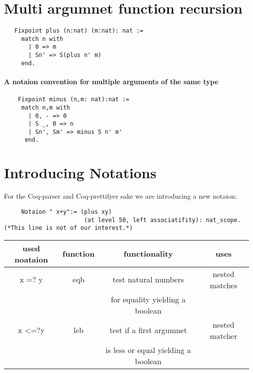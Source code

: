    \section{Multi argumnet function recursion}
   
   \begin{lstlisting}
   Fixpoint plus (n:nat) (m:nat): nat :=
     match n with
       | 0 => m
       | Sn' => S(plus n' m)
     end.
   \end{lstlisting}
   
   \paragraph{A notaion convention for multiple arguments of the same type}
   \begin{lstlisting}
    Fixpoint minus (n,m: nat):nat :=
     match n,m with
       | 0, - => 0
       | S _, 0 => n
       | Sn', Sm' => minus S n' m'
      end.
   \end{lstlisting}
        
   \section{Introducing Notations}
    For the Coq-parser and Coq-prettifyer sake we are introducing a new notaion:
    \begin{lstlisting}
     Notaion " x+y":= (plus xy)
                       (at level 50, left associatifity): nat_scope. (*This line is not of our interest.*)
    \end{lstlisting} 
   
   
   \begin{center}
   \begin{tabular}{|c|c|c|c|}
     \hline 
 	  used noataion & function        & functionality                       & uses           \\  \hline
  	  x =? y        & eqb             & test natural numbers                & nested matches \\  
  	                &                 & for equality yielding a boolean     &                \\  \hline
   	  x <=?y        & leb             & test if a first argumnet            & nested matcher \\  
   	                &                 & is less or equal yielding a boolean &                \\  \hline
   	 \hline
   \end{tabular}
   \end{center}
   

   